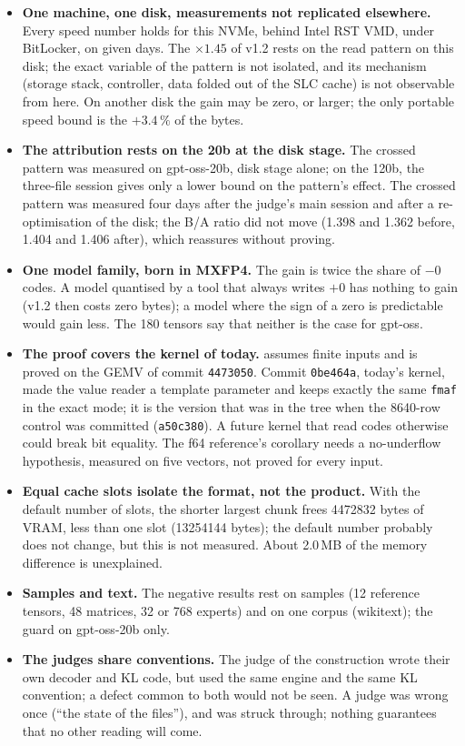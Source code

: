 \documentclass[11pt, a4paper]{article}
\theoremstyle{remark}
\begin{document}
\begin{itemize}
\item \textbf{One machine, one disk, measurements not replicated elsewhere.} Every speed number holds for this NVMe, behind Intel RST VMD, under BitLocker, on given days. The $\times 1.45$ of v1.2 rests on the read pattern on this disk; the exact variable of the pattern is not isolated, and its mechanism (storage stack, controller, data folded out of the SLC cache) is not observable from here. On another disk the gain may be zero, or larger; the only portable speed bound is the $+3.4\,\%$ of the bytes.
\item \textbf{The attribution rests on the 20b at the disk stage.} The crossed pattern was measured on gpt-oss-20b, disk stage alone; on the 120b, the three-file session gives only a lower bound on the pattern's effect. The crossed pattern was measured four days after the judge's main session and after a re-optimisation of the disk; the B/A ratio did not move (1.398 and 1.362 before, 1.404 and 1.406 after), which reassures without proving.
\item \textbf{One model family, born in MXFP4.} The gain is twice the share of $-0$ codes. A model quantised by a tool that always writes $+0$ has nothing to gain (v1.2 then costs zero bytes); a model where the sign of a zero is predictable would gain less. The 180 tensors say that neither is the case for gpt-oss.
\item \textbf{The proof covers the kernel of today.}  assumes finite inputs and is proved on the GEMV of commit \texttt{4473050}. Commit \texttt{0be464a}, today's kernel, made the value reader a template parameter and keeps exactly the same \texttt{fmaf} in the exact mode; it is the version that was in the tree when the \num{8640}-row control was committed (\texttt{a50c380}). A future kernel that read codes otherwise could break bit equality. The f64 reference's corollary needs a no-underflow hypothesis, measured on five vectors, not proved for every input.
\item \textbf{Equal cache slots isolate the format, not the product.} With the default number of slots, the shorter largest chunk frees \num{4472832} bytes of VRAM, less than one slot (\num{13254144} bytes); the default number probably does not change, but this is not measured. About 2.0\,MB of the memory difference is unexplained.
\item \textbf{Samples and text.} The negative results rest on samples (12 reference tensors, 48 matrices, 32 or 768 experts) and on one corpus (wikitext); the guard on gpt-oss-20b only.
\item \textbf{The judges share conventions.} The judge of the construction wrote their own decoder and KL code, but used the same engine and the same KL convention; a defect common to both would not be seen. A judge was wrong once (``the state of the files''), and was struck through; nothing guarantees that no other reading will come.
\end{itemize}
\end{document}

